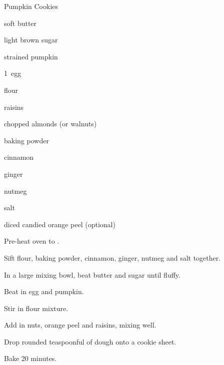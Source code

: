 \begin{recipe}{Pumpkin Cookies}{}{}

\begin{ingredients}
\item \C{\quarter} soft butter
\item \C{\half} light brown sugar
\item \C{\half} strained pumpkin
\item 1~egg
\item {} flour
\item \C{\half} raisins
\item \C{\half}  chopped almonds (or walnuts)
\item {} baking powder
\item {} cinnamon
\item \tp{\quarter} ginger
\item \tp{\quarter} nutmeg
\item \tp{\quarter} salt
\item \C{\quarter} diced candied orange peel (optional)
\end{ingredients}

\begin{directions}
\item Pre-heat oven to . 
\item Sift flour, baking powder, cinnamon, ginger, nutmeg and salt together.
\item In a large mixing bowl, beat butter and sugar until fluffy. 
\item Beat in egg and pumpkin.
\item Stir in flour mixture. 
\item Add in nuts, orange peel and raisins, mixing well. 
\item Drop rounded teaspoonful of dough onto a cookie sheet. 
\item Bake 20 minutes.
\end{directions}
\end{recipe}
